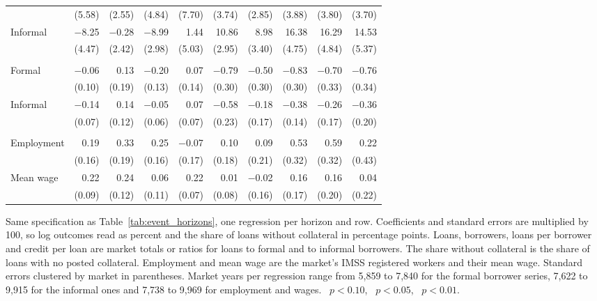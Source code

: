 \begin{threeparttable}
\begin{tabular}{@{}lrrrrrrrrr@{}}
 & (5.58) & (2.55) & (4.84) & (7.70) & (3.74) & (2.85) & (3.88) & (3.80) & (3.70) \\
\quad Informal & $-$8.25\sym{*} & $-$0.28 & $-$8.99\sym{***} & 1.44 & 10.86\sym{***} & 8.98\sym{***} & 16.38\sym{***} & 16.29\sym{***} & 14.53\sym{***} \\
 & (4.47) & (2.42) & (2.98) & (5.03) & (2.95) & (3.40) & (4.75) & (4.84) & (5.37) \\
\addlinespace[3pt]
\multicolumn{10}{@{}l}{\textit{Share of loans without collateral}} \\
\quad Formal & $-$0.06 & 0.13 & $-$0.20 & 0.07 & $-$0.79\sym{***} & $-$0.50 & $-$0.83\sym{***} & $-$0.70\sym{**} & $-$0.76\sym{**} \\
 & (0.10) & (0.19) & (0.13) & (0.14) & (0.30) & (0.30) & (0.30) & (0.33) & (0.34) \\
\quad Informal & $-$0.14\sym{**} & 0.14 & $-$0.05 & 0.07 & $-$0.58\sym{**} & $-$0.18 & $-$0.38\sym{***} & $-$0.26 & $-$0.36\sym{*} \\
 & (0.07) & (0.12) & (0.06) & (0.07) & (0.23) & (0.17) & (0.14) & (0.17) & (0.20) \\
\addlinespace[3pt]
\multicolumn{10}{@{}l}{\textit{Formal sector, IMSS (log)}} \\
\quad Employment & 0.19 & 0.33\sym{*} & 0.25 & $-$0.07 & 0.10 & 0.09 & 0.53\sym{*} & 0.59\sym{*} & 0.22 \\
 & (0.16) & (0.19) & (0.16) & (0.17) & (0.18) & (0.21) & (0.32) & (0.32) & (0.43) \\
\quad Mean wage & 0.22\sym{**} & 0.24\sym{**} & 0.06 & 0.22\sym{***} & 0.01 & $-$0.02 & 0.16 & 0.16 & 0.04 \\
 & (0.09) & (0.12) & (0.11) & (0.07) & (0.08) & (0.16) & (0.17) & (0.20) & (0.22) \\
\bottomrule
\end{tabular}
\begin{tablenotes}[flushleft]
\footnotesize
\item Same specification as Table~\ref{tab:event_horizons}, one regression per horizon and row. Coefficients and standard errors are multiplied by 100, so log outcomes read as percent and the share of loans without collateral in percentage points. Loans, borrowers, loans per borrower and credit per loan are market totals or ratios for loans to formal and to informal borrowers. The share without collateral is the share of loans with no posted collateral. Employment and mean wage are the market's IMSS registered workers and their mean wage. Standard errors clustered by market in parentheses. Market years per regression range from 5,859 to 7,840 for the formal borrower series, 7,622 to 9,915 for the informal ones and 7,738 to 9,969 for employment and wages. \sym{*}~$p<0.10$, \sym{**}~$p<0.05$, \sym{***}~$p<0.01$.
\end{tablenotes}
\end{threeparttable}